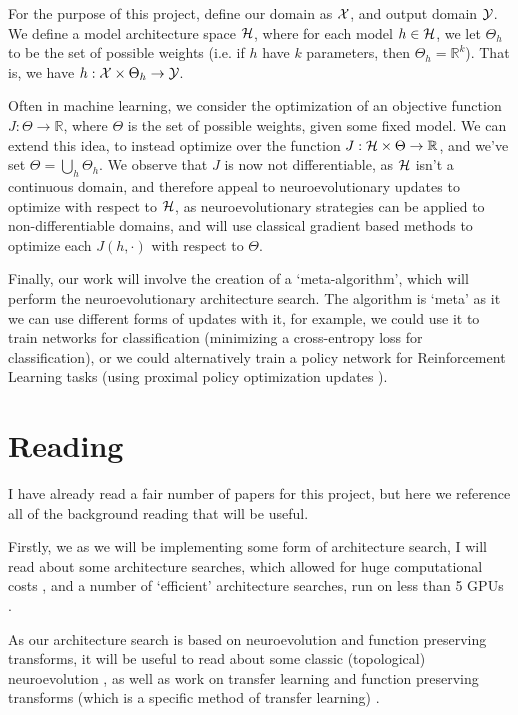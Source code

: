 \documentclass[10pt,twocolumn,letterpaper]{article}
\begin{document}
For the purpose of this project, define our domain as $\mathcal{X}$, and output domain $\mathcal{Y}$. We define a model architecture space $\mathcal{H}$, where for each model $h \in \mathcal{H}$, we let $\Theta_h$ to be the set of possible weights (i.e. if $h$ have $k$ parameters, then $\Theta_h = \mathbb{R}^k$). That is, we have $h:\mathcal{X} \times \Theta_h \rightarrow \mathcal{Y}$. 

Often in machine learning, we consider the optimization of an objective function $J:\Theta \rightarrow \mathbb{R}$, where $\Theta$ is the set of possible weights, given some fixed model. We can extend this idea, to instead optimize over the function $J:\mathcal{H}\times\Theta \rightarrow \mathbb{R}$, and we've set $\Theta = \bigcup_h \Theta_h$. We observe that $J$ is now not differentiable, as $\mathcal{H}$ isn't a continuous domain, and therefore appeal to neuroevolutionary updates to optimize with respect to $\mathcal{H}$, as neuroevolutionary strategies can be applied to non-differentiable domains, and will use classical gradient based methods to optimize each $J(h,\cdot)$ with respect to $\Theta$. 

Finally, our work will involve the creation of a `meta-algorithm', which will perform the neuroevolutionary architecture search. The algorithm is `meta' as it we can use different forms of updates with it, for example, we could use it to train networks for classification (minimizing a cross-entropy loss for classification), or we could alternatively train a policy network for Reinforcement Learning tasks (using proximal policy optimization updates \cite{PPO}).





\section{Reading}
I have already read a fair number of papers for this project, but here we reference all of the background reading that will be useful.

Firstly, we as we will be implementing some form of architecture search, I will read about some architecture searches, which allowed for huge computational costs \cite{as1, as2}, and a number of `efficient' architecture searches, run on less than 5 GPUs \cite{eas1, eas2}. 

As our architecture search is based on neuroevolution and function preserving transforms, it will be useful to read about some classic (topological) neuroevolution \cite{shimonsarl, ne1, ne2, ne3}, as well as work on transfer learning and function preserving transforms (which is a specific method of transfer learning) \cite{transfer1, net2net}.
\end{document}
